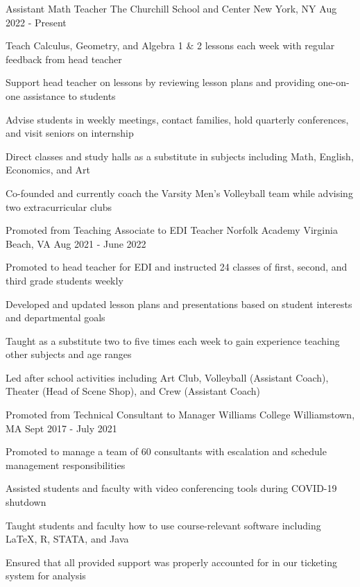 \begin{cventries}
  \cventry
  {Assistant Math Teacher}
  {The Churchill School and Center}
  {New York, NY}
  {Aug 2022 - Present}
  {
    \begin{cvitems}
      \item {Teach Calculus, Geometry, and Algebra 1 \& 2 lessons each week with regular feedback from head teacher}
      \item {Support head teacher on lessons by reviewing lesson plans and providing one-on-one assistance to students}
      \item {Advise students in weekly meetings, contact families, hold quarterly conferences, and visit seniors on internship}
      \item {Direct classes and study halls as a substitute in subjects including Math, English, Economics, and Art}
      \item {Co-founded and currently coach the Varsity Men's Volleyball team while advising two extracurricular clubs}
    \end{cvitems}
  }

  \cventry
  {Promoted from Teaching Associate to EDI Teacher}
  {Norfolk Academy}
  {Virginia Beach, VA}
  {Aug 2021 - June 2022}
  {
    \begin{cvitems}
      \item {Promoted to head teacher for EDI and instructed 24 classes of first, second, and third grade students weekly}
      \item {Developed and updated lesson plans and presentations based on student interests and departmental goals}
      \item {Taught as a substitute two to five times each week to gain experience teaching other subjects and age ranges}
      \item {Led after school activities including Art Club, Volleyball (Assistant Coach), Theater (Head of Scene Shop), and Crew (Assistant Coach)}
    \end{cvitems}
  }

  \cventry
  {Promoted from Technical Consultant to Manager}
  {Williams College}
  {Williamstown, MA}
  {Sept 2017 - July 2021}
  {
    \begin{cvitems}
      \item {Promoted to manage a team of 60 consultants with escalation and schedule management responsibilities}
      \item {Assisted students and faculty with video conferencing tools during COVID-19 shutdown}
      \item {Taught students and faculty how to use course-relevant software including LaTeX, R, STATA, and Java}
      \item {Ensured that all provided support was properly accounted for in our ticketing system for analysis}
    \end{cvitems}
  }


\end{cventries}

